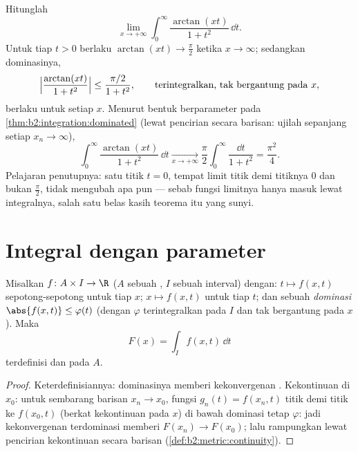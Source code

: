 \begin{example}
\label{ex:b2:integration:arctanlimit}
Hitunglah
\[
\lim_{x\to+\infty}\int_0^\infty
\frac{\arctan(xt)}{1+t^2}\,\dd t .
\]
Untuk tiap $t > 0$ berlaku
$\arctan(xt) \to \frac\pi2$ ketika $x \to \infty$; sedangkan
dominasinya,
\[
\Bigl|\frac{\arctan(xt)}{1+t^2}\Bigr|
\leq \frac{\pi/2}{1+t^2},
\qquad\text{terintegralkan, tak bergantung pada } x,
\]
berlaku untuk setiap $x$. Menurut bentuk berparameter  pada
\cref{thm:b2:integration:dominated} (lewat pencirian secara barisan:
ujilah sepanjang setiap $x_n \to \infty$),
\[
\int_0^\infty\frac{\arctan(xt)}{1+t^2}\,\dd t
\xrightarrow[x\to+\infty]{}
\frac\pi2\int_0^\infty\frac{\dd t}{1+t^2}
= \frac{\pi^2}{4} .
\]
Pelajaran penutupnya: satu titik $t = 0$, tempat limit titik demi
titiknya $0$ dan bukan $\frac\pi2$, tidak mengubah apa pun --- sebab
fungsi limitnya hanya masuk lewat integralnya, salah satu belas kasih
teorema itu yang sunyi.
\end{example}

\section{Integral dengan parameter}

\begin{theorem}\label{thm:b2:integration:continuity}
Misalkan $f \colon A \times I \to \R$ ($A$ sebuah , $I$
sebuah interval) dengan: $t \mapsto f(x, t)$  sepotong-sepotong
untuk tiap $x$; $x \mapsto f(x, t)$  untuk tiap $t$; dan sebuah
\emph{dominasi} $\abs{f(x,t)} \leq \varphi(t)$ (dengan $\varphi$
terintegralkan pada $I$ dan tak bergantung pada $x$). Maka
\[
F(x) = \int_I f(x, t)\,\dd t
\]
terdefinisi dan  pada $A$.
\end{theorem}

\begin{proof}
Keterdefinisiannya: dominasinya memberi kekonvergenan .
Kekontinuan di $x_0$: untuk sembarang barisan $x_n \to x_0$, fungsi
$g_n(t) = f(x_n, t)$  titik demi titik ke $f(x_0, t)$ (berkat
kekontinuan pada $x$) di bawah dominasi tetap $\varphi$: jadi
kekonvergenan terdominasi memberi $F(x_n) \to F(x_0)$; lalu rampungkan
lewat pencirian kekontinuan secara barisan (\cref{def:b2:metric:continuity}).
\end{proof}

